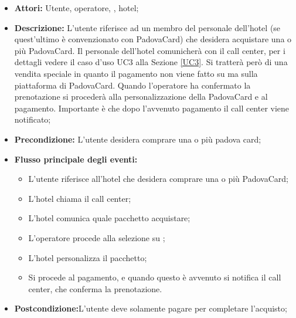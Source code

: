 \begin{itemize}
\item \textbf{Attori:} Utente, operatore, \charta, hotel;
\item \textbf{Descrizione:} L'utente riferisce ad un membro del personale dell'hotel (se quest'ultimo è convenzionato con PadovaCard) che desidera acquistare una o più PadovaCard. Il personale dell'hotel comunicherà con il call center, per i dettagli vedere il caso d'uso UC3 alla Sezione \ref{UC3}. Si tratterà però di una vendita speciale in quanto il pagamento non viene fatto su \tlite ma sulla piattaforma di PadovaCard. Quando l'operatore ha confermato la prenotazione si procederà alla personalizzazione della PadovaCard e al pagamento. Importante è che dopo l'avvenuto pagamento il call center viene notificato;
\item \textbf{Precondizione:} L'utente desidera comprare una o più padova card;
\item \textbf{Flusso principale degli eventi:}
	\begin{itemize}
    	\item L'utente riferisce all'hotel che desidera comprare una o più PadovaCard;
		\item L'hotel chiama il call center;
		\item L'hotel comunica quale pacchetto acquistare;
        \item L'operatore procede alla selezione su \tlite;
        \item L'hotel personalizza il pacchetto;
        \item Si procede al pagamento, e quando questo è avvenuto si notifica il call center, che conferma la prenotazione.
	\end{itemize}
\item \textbf{Postcondizione:}L'utente deve solamente pagare per completare l'acquisto;
\end{itemize}

